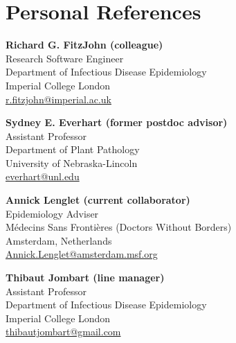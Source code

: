 \documentclass[10pt,letterpaper,roman]{moderncv} %
\begin{document}
\section{Personal References}

\textbf{Richard G. FitzJohn (colleague)}\\
Research Software Engineer\\
Department of Infectious Disease Epidemiology\\
Imperial College London\\
\href{mailto:r.fitzjohn@imperial.ac.uk?subject=Reference for Zhian N. Kamvar}{r.fitzjohn@imperial.ac.uk}

\bigskip

\textbf{Sydney E. Everhart (former postdoc advisor)}\\
Assistant Professor\\
Department of Plant Pathology\\
University of Nebraska-Lincoln\\
\href{mailto:everhart@unl.edu?subject=Reference for Zhian N. Kamvar}{everhart@unl.edu}

\bigskip

\textbf{Annick Lenglet (current collaborator)}\\
Epidemiology Adviser\\
M\'{e}decins Sans Fronti\`{e}res (Doctors Without Borders)\\ 
Amsterdam, Netherlands\\
\href{mailto:Annick.Lenglet@amsterdam.msf.org?subject=Reference for Zhian N. Kamvar}{Annick.Lenglet@amsterdam.msf.org}

\bigskip

\textbf{Thibaut Jombart (line manager)}\\
Assistant Professor\\
Department of Infectious Disease Epidemiology\\
Imperial College London\\
\href{mailto:thibautjombart@gmail.com?subject=Reference for Zhian N. Kamvar}{thibautjombart@gmail.com}
\end{document}
